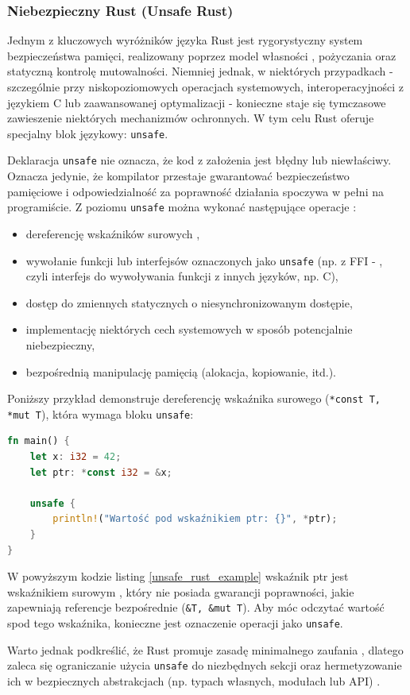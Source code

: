 \subsubsection{Niebezpieczny Rust (Unsafe Rust)}
Jednym z kluczowych wyróżników języka Rust jest rygorystyczny system bezpieczeństwa pamięci, realizowany poprzez model własności , pożyczania  oraz statyczną kontrolę mutowalności. Niemniej jednak, w niektórych przypadkach - szczególnie przy niskopoziomowych operacjach systemowych, interoperacyjności z językiem C lub zaawansowanej optymalizacji - konieczne staje się tymczasowe zawieszenie niektórych mechanizmów ochronnych. W tym celu Rust oferuje specjalny blok językowy: \texttt{unsafe}.

Deklaracja \texttt{unsafe} nie oznacza, że kod z założenia jest błędny lub niewłaściwy. Oznacza jedynie, że kompilator przestaje gwarantować bezpieczeństwo pamięciowe i odpowiedzialność za poprawność działania spoczywa w pełni na programiście. Z poziomu \texttt{unsafe} można wykonać następujące operacje \cite{UnsafeRust,TheRustProgrammingLanguage} :
\begin{itemize}
\item dereferencję wskaźników surowych ,
\item wywołanie funkcji lub interfejsów oznaczonych jako \texttt{unsafe} (np. z FFI - , czyli interfejs do wywoływania funkcji z innych języków, np. C),
\item dostęp do zmiennych statycznych o niesynchronizowanym dostępie,
\item implementację niektórych cech  systemowych w sposób potencjalnie niebezpieczny,
\item bezpośrednią manipulację pamięcią (alokacja, kopiowanie, itd.).
\end{itemize} 
Poniższy przykład demonstruje dereferencję wskaźnika surowego (\texttt{*const T, *mut T}), która wymaga bloku \texttt{unsafe}:
\begin{lstlisting}[language=Rust, caption=Przykład użycia unsafe Rust, label=unsafe_rust_example]
fn main() {
    let x: i32 = 42;
    let ptr: *const i32 = &x;

    unsafe {
        println!("Wartość pod wskaźnikiem ptr: {}", *ptr);
    }
}
\end{lstlisting}
W powyższym kodzie listing \ref{unsafe_rust_example} wskaźnik ptr jest wskaźnikiem surowym , który nie posiada gwarancji poprawności, jakie zapewniają referencje bezpośrednie \mbox{(\texttt{\&T, \&mut T})}. Aby móc odczytać wartość spod tego wskaźnika, konieczne jest oznaczenie operacji jako \texttt{unsafe}.

Warto jednak podkreślić, że Rust promuje zasadę minimalnego zaufania , dlatego zaleca się ograniczanie użycia \texttt{unsafe} do niezbędnych sekcji oraz hermetyzowanie ich w bezpiecznych abstrakcjach (np. typach własnych, modułach lub API) \cite{UnsafeRust}.




